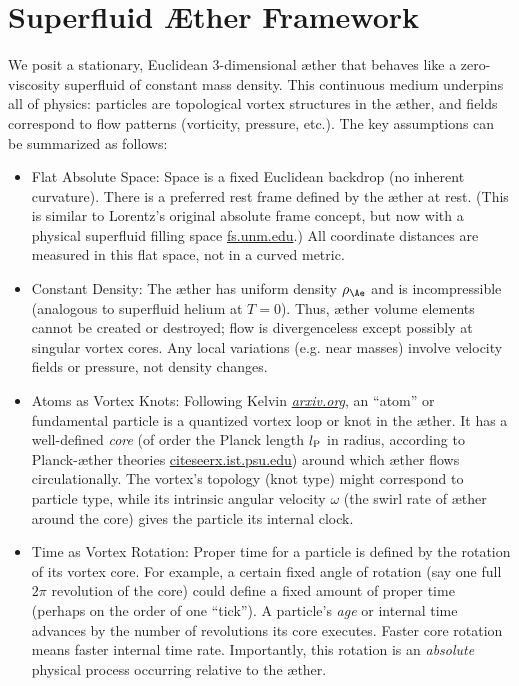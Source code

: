
\section*{Superfluid Æther Framework}

We posit a stationary, Euclidean 3-dimensional æther that behaves like a zero-viscosity superfluid of constant mass density. This continuous medium underpins all of physics: particles are topological vortex structures in the æther, and fields correspond to flow patterns (vorticity, pressure, etc.). The key assumptions can be summarized as follows:

\begin{itemize}
    \item
    Flat Absolute Space: Space is a fixed Euclidean backdrop (no inherent curvature). There is a preferred rest frame defined by the æther at rest. (This is similar to Lorentz’s original absolute frame concept, but now with a physical superfluid filling space
    \href{https://fs.unm.edu/QuantizationDiscretization.pdf#:~:text=Winterberg%20,an%20equal%20number%20of%20positive}{fs.unm.edu}.) All coordinate distances are measured in this flat space, not in a curved metric.

    \item
    Constant Density: The æther has uniform density $\rho_{\Ae}$ and is incompressible (analogous to superfluid helium at $T=0$). Thus, æther volume elements cannot be created or destroyed; flow is divergenceless except possibly at singular vortex cores. Any local variations (e.g. near masses) involve velocity fields or pressure, not density changes.

    \item
    Atoms as Vortex Knots: Following Kelvin
    \href{https://arxiv.org/pdf/2012.07395#:~:text=Thomson%20,on%20the%20right%20path%20when}{\textit{arxiv.org}}, an “atom” or fundamental particle is a quantized vortex loop or knot in the æther. It has a well-defined \textit{core} (of order the Planck length $l_{\rm P}$ in radius, according to Planck-æther theories
    \href{https://citeseerx.ist.psu.edu/document?repid=rep1&type=pdf&doi=25483f1ebc9dc442a9f1505a49d96eb35e92e3f4#:~:text=45,on%20General%20Relativity%20and%20Relativistic}{citeseerx.ist.psu.edu}) around which æther flows circulationally. The vortex’s topology (knot type) might correspond to particle type, while its intrinsic angular velocity $\omega$ (the swirl rate of æther around the core) gives the particle its internal clock.

    \item
    Time as Vortex Rotation: Proper time for a particle is defined by the rotation of its vortex core. For example, a certain fixed angle of rotation (say one full $2\pi$ revolution of the core) could define a fixed amount of proper time (perhaps on the order of one “tick”). A particle’s \textit{age} or internal time advances by the number of revolutions its core executes. Faster core rotation means faster internal time rate. Importantly, this rotation is an \textit{absolute} physical process occurring relative to the æther.


\end{itemize}
